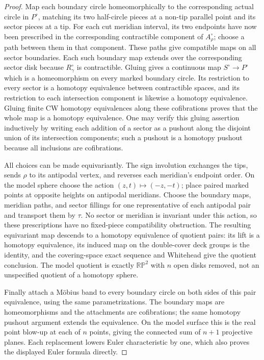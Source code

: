 \documentclass[11pt,a4paper]{article}
\begin{document}
\begin{proof}
Map each boundary circle homeomorphically to the corresponding actual
circle in $P^\circ$, matching its two half-circle pieces at a non-tip
parallel point and its sector pieces at a tip. For each cut meridian
interval, its two endpoints have now been prescribed in the corresponding
contractible component of $A_\rho^\circ$; choose a path between them in
that component. These paths give compatible maps on all sector boundaries.
Each such boundary map extends over the corresponding sector disk because
$R_\gamma^\circ$ is contractible. Gluing gives a continuous map
$S^\circ\to P^\circ$ which is a homeomorphism on every marked boundary
circle. Its restriction to every sector is a homotopy equivalence between
contractible spaces, and its restriction to each intersection component is
likewise a homotopy equivalence. Gluing finite CW homotopy equivalences
along these cofibrations proves that the whole map is a homotopy
equivalence. One may verify this gluing assertion inductively by writing
each addition of a sector as a pushout along the disjoint union of its
intersection components; such a pushout is a homotopy pushout because all
inclusions are cofibrations.

All choices can be made equivariantly. The sign involution exchanges the
tips, sends $\rho$ to its antipodal vertex, and reverses each meridian's
endpoint order. On the model sphere choose the action $(z,t)\mapsto(-z,-t)$;
place paired marked points at opposite heights on antipodal meridians.
Choose the boundary maps, meridian paths, and sector fillings for one
representative of each antipodal pair and transport them by $\tau$. No
sector or meridian is invariant under this action, so these prescriptions
have no fixed-piece compatibility obstruction. The resulting equivariant
map descends to a homotopy equivalence of quotient pairs: its lift is a
homotopy equivalence, its induced map on the double-cover deck groups is
the identity, and the covering-space exact sequence and Whitehead give
the quotient conclusion. The model quotient is exactly
$\mathbb {RP}^2$ with $n$ open disks removed, not an unspecified quotient
of a homotopy sphere.

Finally attach a M\"obius band to every boundary circle on both sides of
this pair equivalence, using the same parametrizations. The boundary maps
are homeomorphisms and the attachments are cofibrations; the same homotopy
pushout argument extends the equivalence. On the model surface this is the
real point blow-up at each of $n$ points, giving the connected sum of
$n+1$ projective planes. Each replacement lowers Euler characteristic by
one, which also proves the displayed Euler formula directly.
\end{proof}
\end{document}
